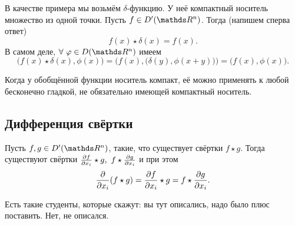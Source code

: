 В качестве примера мы возьмём $\delta$-функцию. У неё компактный носитель множество из одной точки. Пусть $f\in D'(\R^n)$. Тогда (напишем сперва ответ)
\[ f(x)\star\delta(x) = f(x).\]
В самом деле, $\forall\ \phi\in D(\R^n)$ имеем
\[
  \big(f(x)\star\delta(x),\phi(x)\big) = \Big(f(x),\big(\delta(y),\phi(x+y)\big)\Big) = 
  \big(f(x),\phi(x)\big).
\]

Когда у обобщённой функции носитель компакт, её можно применять к любой бесконечно гладкой, не обязательно имеющей компактный носитель.
\subsection{Дифференция свёртки}
\begin{The}
  Пусть $f,g\in D'(\R^n)$, такие, что существует свёртки $f\star g$. Тогда существуют свёртки $\CP f{x_i}\star g,\ f\star\CP g{x_i}$ и при этом
  \[
    \frac{\partial }{\partial x_i}(f\star g) = \frac{\partial f}{\partial x_i}\star g = f\star\frac{\partial g}{\partial x_i}.
  \]
\end{The}
Есть такие студенты, которые скажут: вы тут описались, надо было плюс поставить. Нет, не описался.

